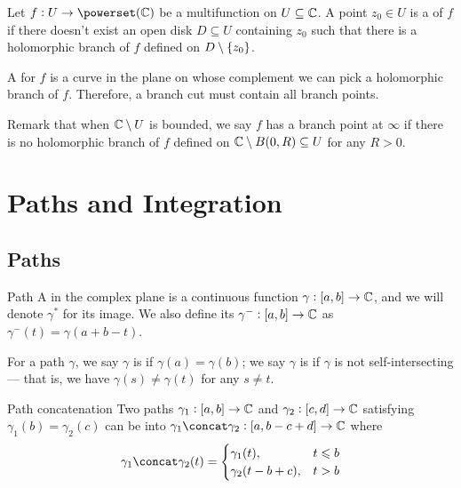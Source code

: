 \documentclass{styles/tufte}
\begin{document}
  \begin{definition}{}{}
    Let $f: U \to \powerset(\CC)$ be a multifunction on $U \subseteq \mathbb{C}$. A point $z_0 \in U$ is a  of $f$ if there doesn't exist an open disk $D \subseteq U$ containing $z_0$ such that there is a holomorphic branch of $f$ defined on $D \setminus \set{z_0}$.
    
    A  for $f$ is a curve in the plane on whose complement we can pick a holomorphic branch of $f$. Therefore, a branch cut must contain all branch points.
  \end{definition}
  
  Remark that when $\mathbb{C} \setminus U$ is bounded, we say $f$ has a branch point at $\infty$ if there is no holomorphic branch of $f$ defined on $\mathbb{C} \setminus B(0, R) \subseteq U$ for any $R > 0$.



\section{Paths and Integration}

\subsection{Paths}
  
  \begin{definition}{Path}{}
    A  in the complex plane is a continuous function $\gamma: [a, b] \to \mathbb{C}$, and we will denote $\gamma^*$ for its image. We also define its  $\gamma^-: [a, b] \to \mathbb{C}$ as $\gamma^-(t) = \gamma(a + b - t)$.
    
    For a path $\gamma$, we say $\gamma$ is  if $\gamma(a) = \gamma(b)$; we say $\gamma$ is  if $\gamma$ is not self-intersecting --- that is, we have $\gamma(s) \neq \gamma(t)$ for any $s \neq t$.
  \end{definition}
  
  \begin{definition}{Path concatenation}{}  
    Two paths $\gamma_1: [a, b] \to \mathbb{C}$ and $\gamma_2: [c, d] \to \mathbb{C}$ satisfying $\gamma_1(b) = \gamma_2(c)$ can be  into $\gamma_1 \concat \gamma_2: [a, b - c + d] \to \CC$ where
    \[ \gamma_1 \concat \gamma_2(t) = \begin{cases}
      \gamma_1(t), & t \leqslant b \\
      \gamma_2(t - b + c), & t > b
    \end{cases} \]
  \end{definition}
  
\end{document}
